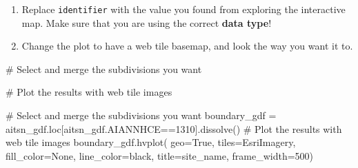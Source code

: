 \documentclass[
  letterpaper,
  DIV=11,
  numbers=noendperiod,
  oneside]{scrreprt}
\newenvironment{Shaded}{\begin{snugshade}}{\end{snugshade}}
\newcommand{\CommentTok}[1]{\textcolor[rgb]{0.37,0.37,0.37}{#1}}
\newcommand{\DecValTok}[1]{\textcolor[rgb]{0.68,0.00,0.00}{#1}}
\newcommand{\NormalTok}[1]{\textcolor[rgb]{0.00,0.23,0.31}{#1}}
\newcommand{\OperatorTok}[1]{\textcolor[rgb]{0.37,0.37,0.37}{#1}}
\newcommand{\StringTok}[1]{\textcolor[rgb]{0.13,0.47,0.30}{#1}}
\newcommand{\VariableTok}[1]{\textcolor[rgb]{0.07,0.07,0.07}{#1}}
\providecommand{\tightlist}{%
  \setlength{\itemsep}{0pt}\setlength{\parskip}{0pt}}
\begin{document}
\begin{tcolorbox}[enhanced jigsaw, colbacktitle=quarto-callout-color!10!white, opacityback=0, bottomtitle=1mm, toptitle=1mm, bottomrule=.15mm, left=2mm, colframe=quarto-callout-color-frame, leftrule=.75mm, opacitybacktitle=0.6, colback=white, rightrule=.15mm, toprule=.15mm, breakable, titlerule=0mm, title=\textcolor{quarto-callout-color}{\faInfo}\hspace{0.5em}{Try It}, coltitle=black, arc=.35mm]

\begin{enumerate}
\def\labelenumi{\arabic{enumi}.}
\tightlist
\item
  Replace \texttt{identifier} with the value you found from exploring
  the interactive map. Make sure that you are using the correct
  \textbf{data type}!
\item
  Change the plot to have a web tile basemap, and look the way you want
  it to.
\end{enumerate}

\end{tcolorbox}

\begin{Shaded}
\begin{Highlighting}[]
\CommentTok{\# Select and merge the subdivisions you want}

\CommentTok{\# Plot the results with web tile images}
\end{Highlighting}
\end{Shaded}

\begin{Shaded}
\begin{Highlighting}[]
\CommentTok{\# Select and merge the subdivisions you want}
\NormalTok{boundary\_gdf }\OperatorTok{=}\NormalTok{ aitsn\_gdf.loc[aitsn\_gdf.AIANNHCE}\OperatorTok{==}\StringTok{\textquotesingle{}1310\textquotesingle{}}\NormalTok{].dissolve()}
\CommentTok{\# Plot the results with web tile images}
\NormalTok{boundary\_gdf.hvplot(}
\NormalTok{    geo}\OperatorTok{=}\VariableTok{True}\NormalTok{, tiles}\OperatorTok{=}\StringTok{\textquotesingle{}EsriImagery\textquotesingle{}}\NormalTok{,}
\NormalTok{    fill\_color}\OperatorTok{=}\VariableTok{None}\NormalTok{, line\_color}\OperatorTok{=}\StringTok{\textquotesingle{}black\textquotesingle{}}\NormalTok{,}
\NormalTok{    title}\OperatorTok{=}\NormalTok{site\_name,}
\NormalTok{    frame\_width}\OperatorTok{=}\DecValTok{500}\NormalTok{)}
\end{Highlighting}
\end{Shaded}
\end{document}
